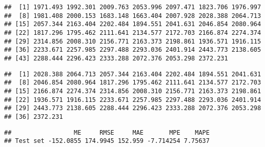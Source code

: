 \documentclass[]{article}
\begin{document}
\begin{verbatim}
##  [1] 1971.493 1992.301 2009.763 2053.996 2097.471 1823.706 1976.997
##  [8] 1981.408 2000.153 1683.148 1663.404 2007.928 2028.388 2064.713
## [15] 2057.344 2163.404 2202.484 1894.551 2041.631 2046.854 2080.964
## [22] 1817.296 1795.462 2111.641 2134.577 2172.703 2166.874 2274.374
## [29] 2314.856 2008.310 2156.771 2163.373 2198.861 1936.571 1916.115
## [36] 2233.671 2257.985 2297.488 2293.036 2401.914 2443.773 2138.605
## [43] 2288.444 2296.423 2333.288 2072.376 2053.298 2372.231
\end{verbatim}

\begin{verbatim}
##  [1] 2028.388 2064.713 2057.344 2163.404 2202.484 1894.551 2041.631
##  [8] 2046.854 2080.964 1817.296 1795.462 2111.641 2134.577 2172.703
## [15] 2166.874 2274.374 2314.856 2008.310 2156.771 2163.373 2198.861
## [22] 1936.571 1916.115 2233.671 2257.985 2297.488 2293.036 2401.914
## [29] 2443.773 2138.605 2288.444 2296.423 2333.288 2072.376 2053.298
## [36] 2372.231
\end{verbatim}

\begin{verbatim}
##                 ME     RMSE     MAE       MPE    MAPE
## Test set -152.0855 174.9945 152.959 -7.714254 7.75637
\end{verbatim}
\end{document}
